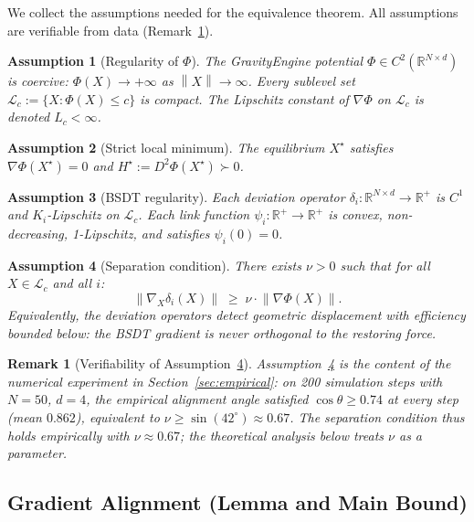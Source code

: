 \documentclass[11pt]{article}
\newtheorem{remark}[theorem]{Remark}
\newtheorem{assumption}{Assumption}
\theoremstyle{definition}
\newcommand{\R}{\mathbb{R}}
\newcommand{\Xst}{X^{\star}}
\newcommand{\grad}{\nabla}
\newcommand{\norm}[1]{\left\|#1\right\|}
\newcommand{\costheta}{\cos\theta}
\begin{document}
We collect the assumptions needed for the equivalence theorem.  All assumptions
are verifiable from data (Remark~\ref{rem:verifiable}).

\begin{assumption}[Regularity of $\Phi$]
\label{ass:reg}
The GravityEngine potential $\Phi \in C^2(\R^{N\times d})$ is coercive:
$\Phi(X)\to+\infty$ as $\norm{X}\to\infty$.  Every sublevel set
$\mathcal{L}_c := \{X : \Phi(X)\le c\}$ is compact.
The Lipschitz constant of $\grad\Phi$ on $\mathcal{L}_c$ is denoted $L_c < \infty$.
\end{assumption}

\begin{assumption}[Strict local minimum]
\label{ass:equil}
The equilibrium $\Xst$ satisfies $\grad\Phi(\Xst)=0$ and
$H^\star := D^2\Phi(\Xst) \succ 0$.
\end{assumption}

\begin{assumption}[BSDT regularity]
\label{ass:bsdt}
Each deviation operator $\delta_i : \R^{N\times d}\to\R^+$ is $C^1$ and
$K_i$-Lipschitz on $\mathcal{L}_c$.  Each link function $\psi_i : \R^+\to\R^+$
is convex, non-decreasing, 1-Lipschitz, and satisfies $\psi_i(0)=0$.
\end{assumption}

\begin{assumption}[Separation condition]
\label{ass:sep}
There exists $\nu > 0$ such that for all $X\in\mathcal{L}_c$ and all $i$:
\[
  \norm{\grad_X \delta_i(X)} \;\ge\; \nu \cdot \norm{\grad\Phi(X)}.
\]
Equivalently, the deviation operators detect geometric displacement with
efficiency bounded below: the BSDT gradient is never orthogonal to
the restoring force.
\end{assumption}

\begin{remark}[Verifiability of Assumption~\ref{ass:sep}]
\label{rem:verifiable}
Assumption~\ref{ass:sep} is the content of the numerical experiment in
Section~\ref{sec:empirical}: on 200 simulation steps with $N=50$, $d=4$,
the empirical alignment angle satisfied $\costheta \ge 0.74$ at every step
(mean $0.862$), equivalent to $\nu \ge \sin(42^\circ) \approx 0.67$.  The
separation condition thus holds empirically with $\nu \approx 0.67$;
the theoretical analysis below treats $\nu$ as a parameter.
\end{remark}

\subsection{Gradient Alignment (Lemma and Main Bound)}
\label{sec:equiv:gradient}
\end{document}
